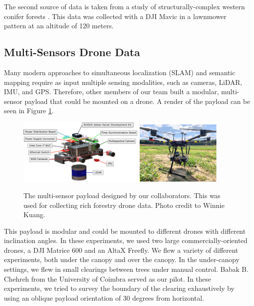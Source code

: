The second source of data is taken from a study of structurally-complex western conifer forests \cite{Young2022}. This data was collected with a DJI Mavic in a lawnmower pattern at an altitude of 120 meters.

\subsection{Multi-Sensors Drone Data}
Many modern approaches to simultaneous localization (SLAM) and semantic mapping require as input multiple sensing modalities, such as cameras, LiDAR, IMU, and GPS. Therefore, other members of our team built a modular, multi-sensor payload that could be mounted on a drone. A render of the payload can be seen in Figure \ref{fig:methods:payload}. 

\begin{figure}
    \centering
    \includegraphics[width=0.55\textwidth]{figs/methods/datasets/payload_annotated.pdf}
    \hfill
    \includegraphics[width=0.37\textwidth]{figs/methods/datasets/payload_on_drone.jpeg}
    \caption{The multi-sensor payload designed by our collaborators. This was used for collecting rich forestry drone data. Photo credit to Winnie Kuang.}
    \label{fig:methods:payload}
\end{figure}

This payload is modular and could be mounted to different drones with different inclination angles. In these experiments, we used two large commercially-oriented drones, a DJI Matrice 600 and an AltaX Freefly. We flew a variety of different experiments, both under the canopy and over the canopy. In the under-canopy settings, we flew in small clearings between trees under manual control. Babak B. Chehreh from the University of Coimbra served as our pilot. In these experiments, we tried to survey the boundary of the clearing exhaustively by using an oblique payload orientation of 30 degrees from horizontal.

